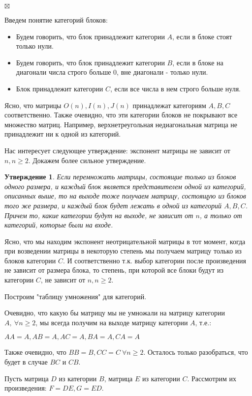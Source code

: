 \documentclass[a4paper,12pt]{report}
\theoremstyle{plain} %
\newtheorem{Statement}{Утверждение}[chapter]
\theoremstyle{definition}
\theoremstyle{remark}
\begin{document}
\begin{large}
$\boxtimes$

Введем понятие категорий блоков:

\begin{itemize}
\item Будем говорить, что блок принадлежит категории $A$, если в блоке стоят только нули.

\item Будем говорить, что блок принадлежит категории $B$, если в блоке на диагонали числа строго больше 0, вне диагонали - только нули.

\item Блок принадлежит категории $C$, если все числа в нем строго больше нуля.
\end{itemize}
Ясно, что матрицы $O(n), I(n), J(n)$ принадлежат категориям $A, B, C$ соответственно. Также очевидно, что эти категории блоков не покрывают все множество матриц. Например, верхнетреугольная недиагональная матрица не принадлежит ни к одной из категорий.

Нас интересует следующее утверждение: экспонент матрицы не зависит от $n, n \geq 2$. Докажем более сильное утверждение.

\begin{Statement}
Если перемножать матрицы, состоящие только из блоков одного размера, и каждый блок является представителем одной из категорий, описанных выше, то на выходе тоже получаем матрицу, состоящую из блоков того же размера, и каждый блок будет лежать в одной из категорий $A,B,C$. Причем то, какие категории будут на выходе, не зависит от $n$, а только от категорий, которые были на входе.
\end{Statement}
Ясно, что мы находим экспонент неотрицательной матрицы в тот момент, когда при возведении матрицы в некоторую степень мы получаем матрицу только из блоков категории $C$. И соответственно т.к. выбор категории после произведения не зависит от размера блока, то степень, при которой все блоки будут из категории $C$, не зависит от $n, n \geq 2$.

Построим "таблицу умножения" для категорий.

Очевидно, что какую бы матрицу мы не умножали на матрицу категории $A, ~\forall n \geq 2$, мы всегда получим на выходе матрицу категории $A$, т.е.:

$AA = A, AB = A, AC = A, BA = A, CA = A$

Также очевидно, что $BB = B, CC = C ~\forall n \geq 2$. Осталось только разобраться, что будет в случае $BC$ и $CB$.

Пусть матрица $D$ из категории $B$, матрица $E$ из категории $C$. Рассмотрим их произведения: $F = DE, G = ED$.


\end{large}
\end{document}
